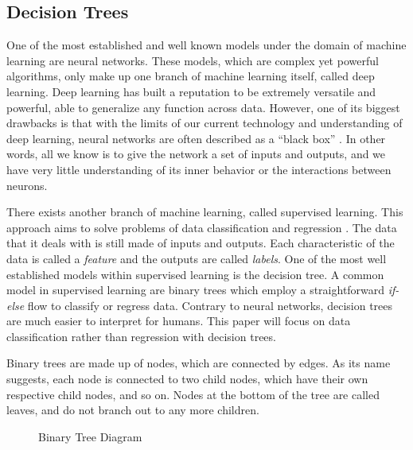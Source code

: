 \documentclass[12pt]{article}
\begin{document}
\subsection{Decision Trees}

One of the most established and well known models under the domain of machine learning are neural networks. These models, which are complex yet powerful algorithms, only make up one branch of machine learning itself, called deep learning. Deep learning has built a reputation to be extremely versatile and powerful, able to generalize any function across data. However, one of its biggest drawbacks is that with the limits of our current technology and understanding of deep learning, neural networks are often described as a ``black box'' \autocite{Buhrmester_Munch_Arens_2019}. In other words, all we know is to give the network a set of inputs and outputs, and we have very little understanding of its inner behavior or the interactions between neurons.

There exists another branch of machine learning, called supervised learning. This approach aims to solve problems of data classification and regression \autocite{Supervised_unsupervised_learning}. The data that it deals with is still made of inputs and outputs. Each characteristic of the data is called a \textit{feature} and the outputs are called \textit{labels}. One of the most well established models within supervised learning is the decision tree. A common model in supervised learning are binary trees which employ a straightforward \textit{if-else} flow to classify or regress data. Contrary to neural networks, decision trees are much easier to interpret for humans. This paper will focus on data classification rather than regression with decision trees.

Binary trees are made up of nodes, which are connected by edges. As its name suggests, each node is connected to two child nodes, which have their own respective child nodes, and so on. Nodes at the bottom of the tree are called leaves, and do not branch out to any more children.

\begin{figure}[H]
    \centering
    \caption{Binary Tree Diagram}
    \label{fig:binarytree}
\end{figure}
\end{document}
